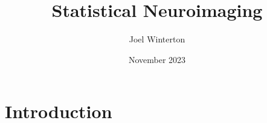 \documentclass{report}
\title{Statistical Neuroimaging}
\author{Joel Winterton}
\date{November 2023}
\begin{document}
\maketitle
\tableofcontents
\chapter{Introduction}
\end{document}
